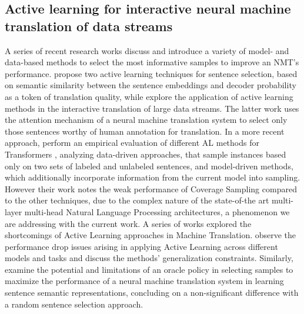 \subsection{Active learning for interactive neural machine translation of data streams}
\label{active-learning-interactive}


A series of recent research works discuss and introduce a variety of model- and data-based methods to select the most informative samples to improve an NMT's performance.
\citet{zhang2018active} propose two active learning techniques for sentence selection, based on semantic similarity between the sentence embeddings and decoder probability as a token of translation quality, while \citet{peris2020active} explore the application of active learning methods in the interactive translation of large data streams. The latter work uses the attention mechanism of a neural machine translation system to select only those sentences worthy of human annotation for translation. 
In a more recent approach, \citet{zeng2019empirical} perform an empirical evaluation of different AL methods for Transformers \cite{vaswani2017attention}, analyzing data-driven approaches, that sample instances based only on two sets of labeled and unlabeled sentences, and model-driven methods, which additionally incorporate information from the current model into sampling. 
However their work notes the weak performance of Coverage Sampling compared to the other techniques, due to the complex nature of the state-of-the art multi-layer multi-head Natural Language Processing architectures, a phenomenon we are addressing with the current work.
A series of works explored the shortcomings of Active Learning approaches in Machine Translation. \cite{lowell2018practical} observe the performance drop issues arising in applying Active Learning across different models and tasks and discuss the methods' generalization constraints. Similarly, \citet{koshorek2019limits} examine the potential and limitations of an oracle policy in selecting samples to maximize the performance of a neural machine translation system in learning sentence semantic representations, concluding on a non-significant difference with a random sentence selection approach.
